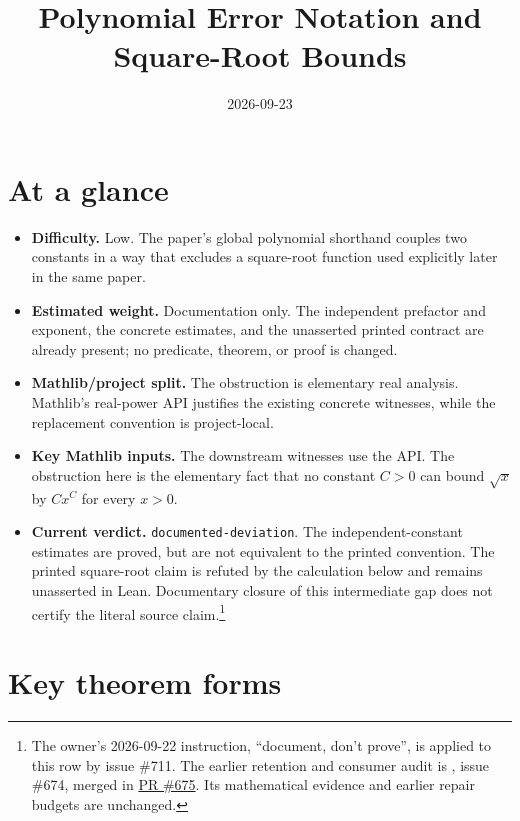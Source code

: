 \documentclass[11pt]{article}
\title{Polynomial Error Notation and Square-Root Bounds}
\author{}
\date{2026-09-23}
\begin{document}
\maketitle

\section{At a glance}

\begin{itemize}
  \item \textbf{Difficulty.} Low.  The paper's global polynomial shorthand
  couples two constants in a way that excludes a square-root function used
  explicitly later in the same paper.
  \item \textbf{Estimated weight.} Documentation only. The independent
  prefactor and exponent, the concrete estimates, and the unasserted printed
  contract are already present; no predicate, theorem, or proof is changed.
  \item \textbf{Mathlib/project split.} The obstruction is elementary real
  analysis. Mathlib's real-power API justifies the existing concrete
  witnesses, while the replacement convention is project-local.
  \item \textbf{Key Mathlib inputs.} The downstream witnesses use the
   API.  The obstruction here is the elementary fact that no
  constant $C>0$ can bound $\sqrt{x}$ by $C x^C$ for every $x>0$.
  \item \textbf{Current verdict.} \texttt{documented-deviation}. The
  independent-constant estimates are proved, but are not equivalent to the
  printed convention. The printed square-root claim is refuted by the
  calculation below and remains unasserted in Lean. Documentary closure of
  this intermediate gap does not certify the literal source claim.\footnote{
  The owner's 2026-09-22 instruction, ``document, don't prove'', is applied
  to this row by issue \#711. The earlier retention and consumer audit is
  , issue \#674, merged in
  \href{https://github.com/Dengnifer/MIPStarRE-QPBT/pull/675}{PR \#675}.
  Its mathematical evidence and earlier repair budgets are unchanged.}
\end{itemize}

\section{Key theorem forms}
\end{document}
